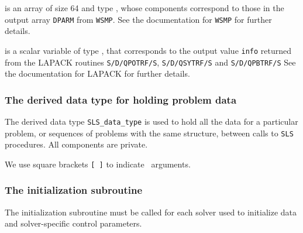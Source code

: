 \documentclass{galahad}
\newcommand{\packagename}{SLS}
\begin{document}
\begin{description}
 is an array of size 64 and type \realdp,
whose components correspond to those in the output array {\tt DPARM}
from {\tt WSMP}. See the documentation for {\tt WSMP} for further
details.

 is a scalar variable of type \integer,
that corresponds to the output value {\tt info} returned from
the LAPACK routines {\tt S/D/QPOTRF/S},
{\tt S/D/QSYTRF/S} and {\tt S/D/QPBTRF/S}
See the documentation for LAPACK for further details.

\end{description}


\subsubsection{The derived data type for holding problem data}\label{typedata}
The derived data type
{\tt \packagename\_data\_type}
is used to hold all the data for a particular problem,
or sequences of problems with the same structure, between calls to
{\tt \packagename} procedures.
All components are private.


\galarguments
We use square brackets {\tt [ ]} to indicate \optional\ arguments.


\subsubsection{The initialization subroutine}\label{subinit}
The initialization subroutine must be called for each solver used
to initialize data and solver-specific control parameters.
\end{document}
